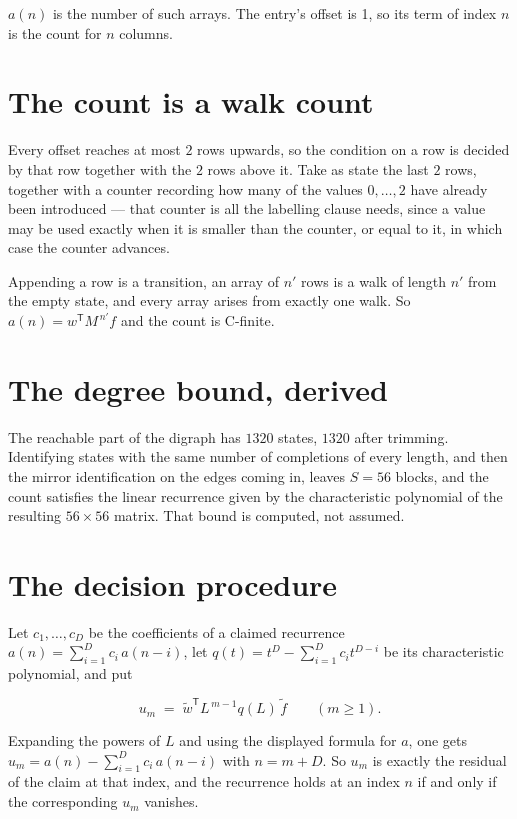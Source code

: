 \documentclass[11pt]{article}
\theoremstyle{definition}
\begin{document}
$a(n)$ is the number of such arrays. The entry's offset is 1, so its term of index $n$ is the count for $n$ columns.

\section{The count is a walk count}

Every offset reaches at most $2$ rows upwards, so the condition on a row is decided by that row together with the $2$ rows above it. Take as state the last $2$ rows, together with a counter recording how many of the values $0,\dots,2$ have already been introduced --- that counter is all the labelling clause needs, since a value may be used exactly when it is smaller than the counter, or equal to it, in which case the counter advances.

Appending a row is a transition, an array of $n'$ rows is a walk of length $n'$ from the empty state, and every array arises from exactly one walk. So $a(n) = w^{\mathsf T}M^{\,n'}f$ and the count is C-finite.

\section{The degree bound, derived}

The reachable part of the digraph has $1320$ states, $1320$ after trimming. Identifying states with the same number of completions of every length, and then the mirror identification on the edges coming in, leaves $S = 56$ blocks, and the count satisfies the linear recurrence given by the characteristic polynomial of the resulting $56\times56$ matrix. That bound is computed, not assumed.

\section{The decision procedure}

Let $c_1,\dots,c_D$ be the coefficients of a claimed recurrence $a(n) = \sum_{i=1}^{D} c_i\,a(n-i)$, let $q(t) = t^{D} - \sum_{i=1}^{D} c_i t^{D-i}$ be its characteristic polynomial, and put

\[u_m \;=\; \tilde w^{\mathsf T} L^{\,m-1} q(L)\,\tilde f \qquad (m \ge 1).\]

Expanding the powers of $L$ and using the displayed formula for $a$, one gets $u_m = a(n) - \sum_{i=1}^{D} c_i\,a(n-i)$ with $n = m + D$. So $u_m$ is exactly the residual of the claim at that index, and the recurrence holds at an index $n$ if and only if the corresponding $u_m$ vanishes.
\end{document}
